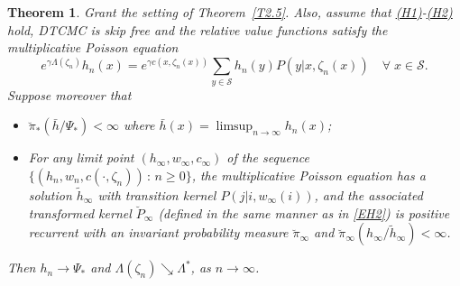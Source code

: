 \documentclass[notitlepage,11pt,reqno]{amsart}
\numberwithin{equation}{section}
\theoremstyle{plain}
\newtheorem{theorem}{Theorem}[section]
\theoremstyle{definition}
\theoremstyle{remark}
\newcommand{\cS}{{\mathcal{S}}}     %
\begin{document}
\begin{theorem}
Grant the setting of Theorem~\ref{T2.5}. Also, assume that \hyperlink{H1}{(H1)}-\hyperlink{H2}{(H2)} hold,  DTCMC is skip free and the relative value functions satisfy the multiplicative Poisson
equation
$$e^{\gamma\Lambda(\zeta_n)}h_n(x)= e^{\gamma c(x, \zeta_n(x))} \sum_{y\in\cS} h_n(y) P(y|x, \zeta_n(x))\quad \forall \; x\in \cS.$$
Suppose moreover that
\begin{itemize}
\item[(i)] $\breve\pi_*(\bar{h}/\Psi_*)<\infty$ where $\bar{h}(x)=\limsup_{n\to\infty} h_n(x)$;
\item[(ii)] For any limit point $(h_\infty, w_\infty, c_\infty)$ of the sequence $\{(h_n, w_n, c(\cdot, \zeta_n))\, :\, n\geq 0\}$, the multiplicative Poisson equation has a solution
$\tilde{h}_\infty$ with transition kernel $P(j|i, w_\infty(i))$, and the associated transformed kernel $\breve{P}_{\infty}$ (defined in the same manner as in \eqref{EH2})
is positive recurrent with an invariant probability measure $\breve\pi_\infty$ and $\breve\pi_\infty(h_\infty/\tilde{h}_\infty)<\infty$.
\end{itemize}
Then $h_n\to \Psi_*$ and $\Lambda(\zeta_n)\searrow \Lambda^*$, as $n\to\infty$.
\end{theorem}
\end{document}
